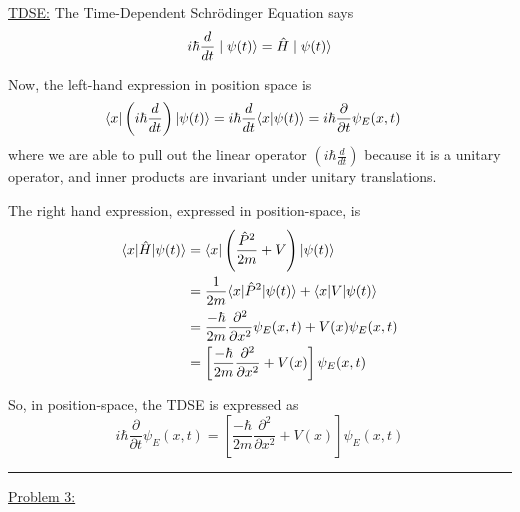 \documentclass[twoside]{article}
\begin{document}
\begin{enumerate}
   \underline{TDSE:}
   The Time-Dependent Schrödinger Equation says 
   \[ i\hbar \frac{d}{dt} \mid\psi(t)\rangle = \hat{H} \mid\psi(t)\rangle \]

   Now, the left-hand expression in position space is 
   \begin{align*}
      \langle x | \left( i\hbar \frac{d}{dt} \right)|\psi(t) \rangle &= i\hbar\frac{d}{dt} \langle x | \psi(t) \rangle = i\hbar\frac{\partial}{\partial t} \psi_E(x,t)
   \end{align*}
   where we are able to pull out the linear operator $\left( i\hbar \frac{d}{dt} \right)$ because it is a unitary operator, and inner products are invariant under unitary translations.

   The right hand expression, expressed in position-space, is 
   \begin{align*}
      \langle x | \hat{H}|\psi(t) \rangle &= \langle x | \left( \frac{\hat{P}^2}{2m} + V\right)|\psi(t) \rangle \\
                              &= \frac{1}{2m}\langle x | \hat{P}^2|\psi(t) \rangle + \langle x | V|\psi(t) \rangle \\
                              &= 
                              \frac{-\hbar}{2m} \frac{\partial^2 }{\partial x^2 } \psi_E(x,t) + V(x)\psi_E(x,t) \\
                              &= \left[ \frac{-\hbar}{2m} \frac{\partial^2 }{\partial x^2 } + V(x) \right]\psi_E(x,t)
   \end{align*}

   So, in position-space, the TDSE is expressed as 
   \[ \boxed{i\hbar\frac{\partial}{\partial t} \psi_E(x,t) = \left[ \frac{-\hbar}{2m} \frac{\partial^2 }{\partial x^2 } + V(x) \right]\psi_E(x,t)} \]
\end{enumerate}
\vskip 0.5cm
\hrule
\vskip 0.5cm

\underline{Problem 3:}
\end{document}
